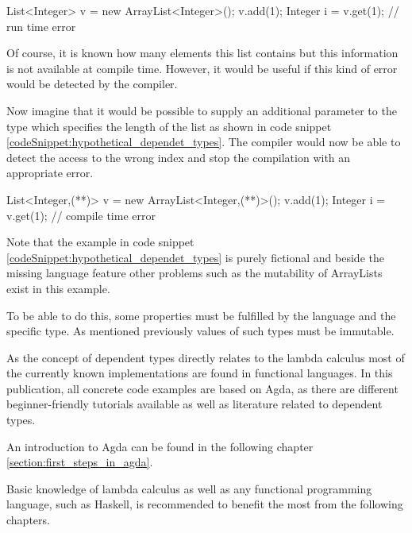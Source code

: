\begin{codesnippet}[caption={ArrayList index error}, label={codeSnippet:array_index_error}]
List<Integer> v = new ArrayList<Integer>();
v.add(1);
Integer i = v.get(1); // run time error
\end{codesnippet}

Of course, it is known how many elements this list contains but this information is not available at compile time. 
However, it would be useful if this kind of error would be detected by the compiler. 

Now imagine that it would be possible to supply an additional parameter to the type which specifies the length of the list as shown in code snippet \ref{codeSnippet:hypothetical_dependet_types}. 
The compiler would now be able to detect the access to the wrong index and stop the compilation with an appropriate error.

\begin{codesnippet}[escapeinside={(*}{*)}, caption={ArrayList with size parameter}, label={codeSnippet:hypothetical_dependet_types}]
List<Integer,(**)> v = new ArrayList<Integer,(**)>();
v.add(1);
Integer i = v.get(1); // compile time error
\end{codesnippet}


Note that the example in code snippet \ref{codeSnippet:hypothetical_dependet_types} is purely fictional and beside the missing language feature other problems such as the mutability of ArrayLists exist in this example.

To be able to do this, some properties must be fulfilled by the language and the specific type. 
As mentioned previously values of such types must be immutable. 

As the concept of dependent types directly relates to the lambda calculus most of the currently known implementations are found in functional languages. 
In this publication, all concrete code examples are based on Agda, as there are different beginner-friendly tutorials available as well as literature related to dependent types.

An introduction to Agda can be found in the following chapter \ref{section:first_steps_in_agda}.

Basic knowledge of lambda calculus as well as any functional programming language, such as Haskell, is recommended to benefit the most from the following chapters.
